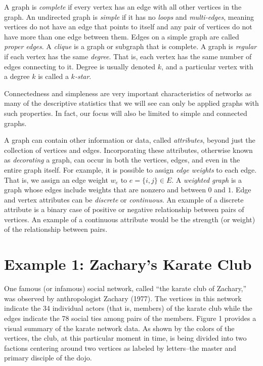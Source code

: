 \documentclass[12pt,twoside]{amherstthesis}
\begin{document}
  A graph is \emph{complete} if every vertex has an edge with all other
  vertices in the graph. An undirected graph is \emph{simple} if it has no
  \emph{loops} and \emph{multi-edges}, meaning vertices do not have an
  edge that points to itself and any pair of vertices do not have more
  than one edge between them. Edges on a simple graph are called
  \emph{proper edges}. A \emph{clique} is a graph or subgraph that is
  complete. A graph is \emph{regular} if each vertex has the same
  \emph{degree}. That is, each vertex has the same number of edges
  connecting to it. Degree is usually denoted \(k\), and a particular
  vertex with a degree \(k\) is called a \emph{\(k\)-star}.
  
  Connectedness and simpleness are very important characteristics of
  networks as many of the descriptive statistics that we will see can only
  be applied graphs with such properties. In fact, our focus will also be
  limited to simple and connected graphs.
  
  A graph can contain other information or data, called \emph{attributes},
  beyond just the collection of vertices and edges. Incorporating these
  attributes, otherwise known as \emph{decorating} a graph, can occur in
  both the vertices, edges, and even in the entire graph itself. For
  example, it is possible to assign \emph{edge weights} to each edge. That
  is, we assign an edge weight \(w_e\) to \(e = \{i, j\} \in E\). A
  \emph{weighted graph} is a graph whose edges include weights that are
  nonzero and between \(0\) and \(1\). Edge and vertex attributes can be
  \emph{discrete} or \emph{continuous}. An example of a discrete attribute
  is a binary case of positive or negative relationship between pairs of
  vertices. An example of a continuous attribute would be the strength (or
  weight) of the relationship between pairs.
  
  \section{Example 1: Zachary's Karate
  Club}\label{example-1-zacharys-karate-club}
  
  One famous (or infamous) social network, called ``the karate club of
  Zachary,'' was observed by anthropologist Zachary (1977). The vertices
  in this network indicate the 34 individual actors (that is, members) of
  the karate club while the edges indicate the 78 social ties among pairs
  of the members. Figure 1 provides a visual summary of the karate network
  data. As shown by the colors of the vertices, the club, at this
  particular moment in time, is being divided into two factions centering
  around two vertices as labeled by letters--the master and primary
  disciple of the dojo.
  
\end{document}
